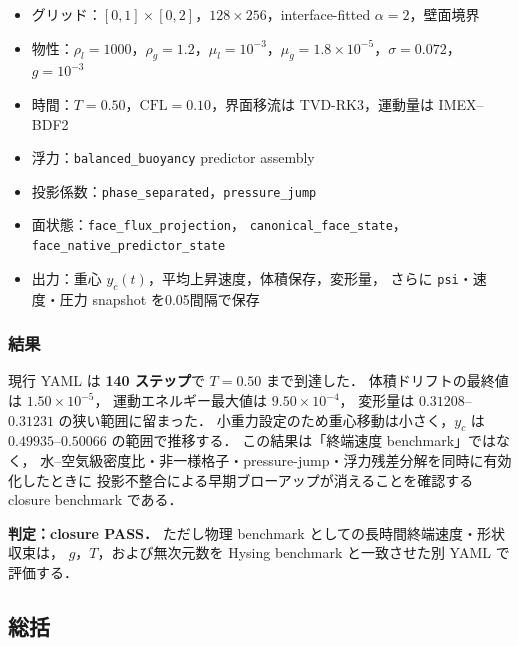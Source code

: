\begin{itemize}[noitemsep,leftmargin=2em]
  \item グリッド：$[0,1]\times[0,2]$，$128\times256$，interface-fitted $\alpha=2$，壁面境界
  \item 物性：$\rho_l=1000$，$\rho_g=1.2$，$\mu_l=10^{-3}$，$\mu_g=1.8\times10^{-5}$，$\sigma=0.072$，$g=10^{-3}$
  \item 時間：$T=0.50$，$\mathrm{CFL}=0.10$，界面移流は TVD-RK3，運動量は IMEX--BDF2
  \item 浮力：\texttt{balanced\_buoyancy} predictor assembly
  \item 投影係数：\texttt{phase\_separated}，\texttt{pressure\_jump}
  \item 面状態：\texttt{face\_flux\_projection}，
        \texttt{canonical\_face\_state}，
        \texttt{face\_native\_predictor\_state}
  \item 出力：重心 $y_c(t)$，平均上昇速度，体積保存，変形量，
        さらに \texttt{psi}・速度・圧力 snapshot を0.05間隔で保存
\end{itemize}

\subsubsection{結果}

現行 YAML は \textbf{140 ステップ}で $T=0.50$ まで到達した．
体積ドリフトの最終値は $1.50\times10^{-5}$，
運動エネルギー最大値は $9.50\times10^{-4}$，
変形量は $0.31208$--$0.31231$ の狭い範囲に留まった．
小重力設定のため重心移動は小さく，$y_c$ は $0.49935$--$0.50066$ の範囲で推移する．
この結果は「終端速度 benchmark」ではなく，
水--空気級密度比・非一様格子・pressure-jump・浮力残差分解を同時に有効化したときに
投影不整合による早期ブローアップが消えることを確認する closure benchmark である．

\noindent\textbf{判定：closure PASS．}
ただし物理 benchmark としての長時間終端速度・形状収束は，
$g$，$T$，および無次元数を Hysing benchmark と一致させた別 YAML で評価する．

\subsection{総括}
\label{sec:val_summary}

